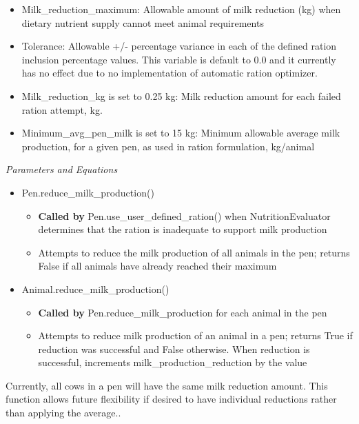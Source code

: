\begin{refsection}
\begin{enumerate}
         \begin{itemize}
             \item Milk\_reduction\_maximum: Allowable amount of milk reduction (kg) when dietary nutrient supply cannot meet animal requirements 
             \item Tolerance: Allowable +/- percentage variance in each of the defined ration inclusion percentage values. This variable is default to 0.0 and it currently has no effect due to no implementation of automatic ration optimizer. 
            \item Milk\_reduction\_kg is set to 0.25 kg: Milk reduction amount for each failed ration attempt, kg. 
            \item Minimum\_avg\_pen\_milk is set to 15 kg: Minimum allowable average milk production, for a given pen, as used in ration formulation, kg/animal
         \end{itemize}

         \textit{Parameters and Equations}
         \vspace{0.1cm}

        \begin{itemize}
            \item Pen.reduce\_milk\_production()
            \begin{itemize}
                \item \textbf{Called by} Pen.use\_user\_defined\_ration() when NutritionEvaluator determines that the ration is inadequate to support milk production
                \item Attempts to reduce the milk production of all animals in the pen; returns False if all animals have already reached their maximum 
            \end{itemize}
            \item Animal.reduce\_milk\_production() 
            \begin{itemize}
                \item \textbf{Called by} Pen.reduce\_milk\_production for each animal in the pen 
                \item Attempts to reduce milk production of an animal in a pen; returns True if reduction was successful and False otherwise. When reduction is successful, increments milk\_production\_reduction by the value 
            \end{itemize}
        \end{itemize}


        \begin{tcolorbox}[colback=white, colframe=black, boxrule=0.5pt, arc=3pt, width=\textwidth]
            Currently, all cows in a pen will have the same milk reduction amount. This function allows future flexibility if desired to have individual reductions rather than applying the average..
        \end{tcolorbox}



\end{enumerate}
\end{refsection}
